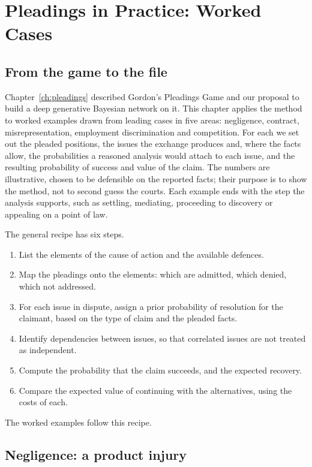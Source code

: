 \chapter{Pleadings in Practice: Worked Cases}
\label{ch:pleadingscases}

\section{From the game to the file}

Chapter~\ref{ch:pleadings} described Gordon's Pleadings Game and our proposal to build a deep generative Bayesian network on it. This chapter applies the method to worked examples drawn from leading cases in five areas: negligence, contract, misrepresentation, employment discrimination and competition. For each we set out the pleaded positions, the issues the exchange produces and, where the facts allow, the probabilities a reasoned analysis would attach to each issue, and the resulting probability of success and value of the claim. The numbers are illustrative, chosen to be defensible on the reported facts; their purpose is to show the method, not to second guess the courts. Each example ends with the step the analysis supports, such as settling, mediating, proceeding to discovery or appealing on a point of law.

The general recipe has six steps.
\begin{enumerate}[label=\arabic*.]
\item List the elements of the cause of action and the available defences.
\item Map the pleadings onto the elements: which are admitted, which denied, which not addressed.
\item For each issue in dispute, assign a prior probability of resolution for the claimant, based on the type of claim and the pleaded facts.
\item Identify dependencies between issues, so that correlated issues are not treated as independent.
\item Compute the probability that the claim succeeds, and the expected recovery.
\item Compare the expected value of continuing with the alternatives, using the costs of each.
\end{enumerate}
The worked examples follow this recipe.

\section{Negligence: a product injury}

